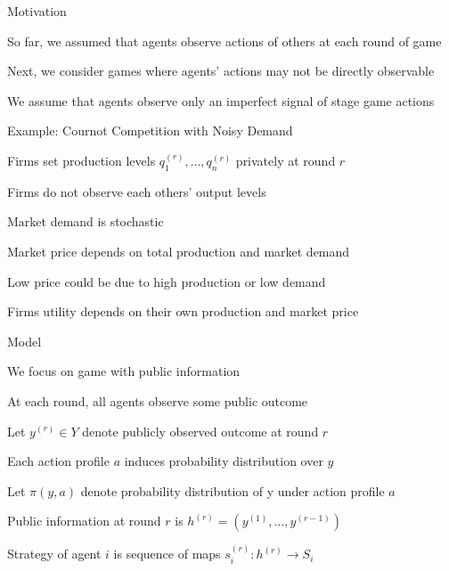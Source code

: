 \documentclass[11pt,aspectratio=169,handout]{beamer}
\begin{document}
  \begin{frame}{Motivation}
   \begin{itemizes}[1.5em]
    \item So far, we assumed that agents observe actions of others at each round of game
    \item Next, we consider games where agents' actions may not be directly observable
    \item We assume that agents observe only an \alert{imperfect signal} of stage game actions
   \end{itemizes}
  \end{frame}   
 
  
  \begin{frame}{Example: Cournot Competition with Noisy Demand\\
  \vspace{-0.2cm}{\scriptsize [Green and Porter, Non-cooperative Collusion under Imperfect Price Information, 1984]}}
   \begin{itemizes}
    \item Firms set production levels $q_1^{(r)}, \dots, q_n^{(r)}$ \alert{privately} at round $r$
    \item Firms do not observe each others' output levels
    \item Market demand is \alert{stochastic}
    \item Market price depends on total production and market demand
    \item Low price could be due to high production or low demand
    \item Firms utility depends on their own production and market price
   \end{itemizes}
  \end{frame}


  \begin{frame}{Model}
   \begin{itemizes}
    \item We focus on game with \alert{public information}
    \item At each round, \alert{all agents} observe some \alert{public outcome}
    \item Let $y^{(r)} \in Y$ denote publicly observed outcome at round $r$
    \item Each action profile $a$ induces \alert{probability distribution} over $y$
    \item Let $\pi (y, a)$ denote probability distribution of y under action profile $a$
    \item Public information at round $r$ is $h^{(r)}=(y^{(1)}, \dots, y^{(r-1)})$
    \item Strategy of agent $i$ is \alert{sequence of maps} $s_i^{(r)}: h^{(r)} \rightarrow S_i$ 
   \end{itemizes}
  \end{frame}
  
\end{document}
